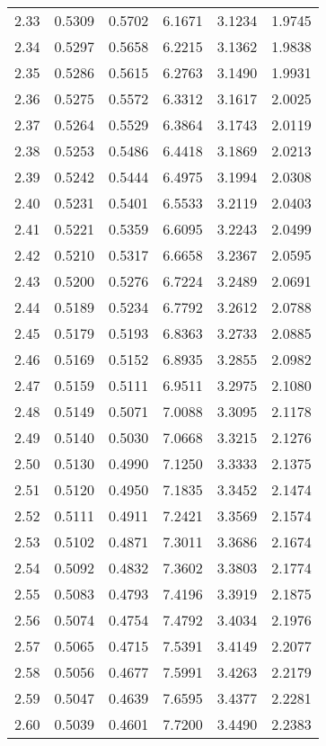 \documentclass{article}
\begin{document}
\begin{longtable}{cccccc}
2.33 & 0.5309 & 0.5702 & 6.1671 & 3.1234 & 1.9745 \\
2.34 & 0.5297 & 0.5658 & 6.2215 & 3.1362 & 1.9838 \\
2.35 & 0.5286 & 0.5615 & 6.2763 & 3.1490 & 1.9931 \\
2.36 & 0.5275 & 0.5572 & 6.3312 & 3.1617 & 2.0025 \\
2.37 & 0.5264 & 0.5529 & 6.3864 & 3.1743 & 2.0119 \\
2.38 & 0.5253 & 0.5486 & 6.4418 & 3.1869 & 2.0213 \\
2.39 & 0.5242 & 0.5444 & 6.4975 & 3.1994 & 2.0308 \\
2.40 & 0.5231 & 0.5401 & 6.5533 & 3.2119 & 2.0403 \\
2.41 & 0.5221 & 0.5359 & 6.6095 & 3.2243 & 2.0499 \\
2.42 & 0.5210 & 0.5317 & 6.6658 & 3.2367 & 2.0595 \\
2.43 & 0.5200 & 0.5276 & 6.7224 & 3.2489 & 2.0691 \\
2.44 & 0.5189 & 0.5234 & 6.7792 & 3.2612 & 2.0788 \\
2.45 & 0.5179 & 0.5193 & 6.8363 & 3.2733 & 2.0885 \\
2.46 & 0.5169 & 0.5152 & 6.8935 & 3.2855 & 2.0982 \\
2.47 & 0.5159 & 0.5111 & 6.9511 & 3.2975 & 2.1080 \\
2.48 & 0.5149 & 0.5071 & 7.0088 & 3.3095 & 2.1178 \\
2.49 & 0.5140 & 0.5030 & 7.0668 & 3.3215 & 2.1276 \\
2.50 & 0.5130 & 0.4990 & 7.1250 & 3.3333 & 2.1375 \\
2.51 & 0.5120 & 0.4950 & 7.1835 & 3.3452 & 2.1474 \\
2.52 & 0.5111 & 0.4911 & 7.2421 & 3.3569 & 2.1574 \\
2.53 & 0.5102 & 0.4871 & 7.3011 & 3.3686 & 2.1674 \\
2.54 & 0.5092 & 0.4832 & 7.3602 & 3.3803 & 2.1774 \\
2.55 & 0.5083 & 0.4793 & 7.4196 & 3.3919 & 2.1875 \\
2.56 & 0.5074 & 0.4754 & 7.4792 & 3.4034 & 2.1976 \\
2.57 & 0.5065 & 0.4715 & 7.5391 & 3.4149 & 2.2077 \\
2.58 & 0.5056 & 0.4677 & 7.5991 & 3.4263 & 2.2179 \\
2.59 & 0.5047 & 0.4639 & 7.6595 & 3.4377 & 2.2281 \\
2.60 & 0.5039 & 0.4601 & 7.7200 & 3.4490 & 2.2383 \\

\end{longtable}
\end{document}
